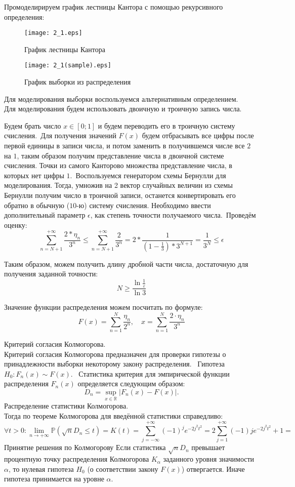 \documentclass[11pt]{article}
\begin{document}
Промоделирируем график лестницы Кантора с помощью рекурсивного определения:
\begin{figure}[ht]

    \texttt{[image: 2\_1.eps]} 
    \caption{График лестницы Кантора}
\end{figure}  

\begin{figure}[ht]

    \texttt{[image: 2\_1(sample).eps]} 
    \caption{График выборки из распределения}
\end{figure}  
\FloatBarrier
 
Для моделирования выборки воспользуемся альтернативным определением. \\
Для моделирования будем использовать двоичную и троичную запись числа.

Будем брать число $x \in [0;1]$ и будем переводить его в троичную систему счисления.\
Для получения значений $F(x)$ будем отбрасывать все цифры после первой единицы в записи числа, и потом заменить в получившемся числе все $2$ на $1$, таким образом получим представление числа в двоичной системе счисления. Точки из самого Канторово множества 
представление числа, в которых нет цифры $1$.\
Воспользуемся генератором схемы Бернулли для моделирования. Тогда, умножив на 2 вектор случайных величин из схемы Бернулли получим число в троичной записи, останется конвертировать его обратно в обычную ($10$-ю) систему счисления. Необходимо ввести дополнительный параметр $\epsilon$, как степень точности получаемого числа.\
Проведём оценку:
$$
\sum_{n=N+1}^{+\infty} \frac{2 * \eta_n}{3^n} \leq \sum_{n=N+1}^{+\infty} \frac{2}{3^n}=2 * \frac{1}{(1 - \frac{1}{3}) * 3^{N+1}}=\frac{1}{3^N} \leq \epsilon
$$

Таким образом, можем получить длину дробной части числа, достаточную для получения заданной точности:
$$
N \geq \frac{\ln \frac{1}{\varepsilon}}{\ln 3}
$$

Значение функции распределения можем посчитать по формуле:
$$
F(x)=\sum_{n=1}^N \frac{\eta_n}{2^n}, \quad x=\sum_{n=1}^N \frac{2 \cdot \eta_n}{3^n}
$$

 Критерий согласия Колмогорова.\\
Критерий согласия Колмогорова предназначен для проверки гипотезы о принадлежности выборки некоторому закону распределения. \
Гипотеза $ H_0 : F_n(x) \sim F(x) $. \
Статистика критерия для эмпирической функции распределения $F_n(x)$ определяется следующим образом:
\[
 D_n = \sup\limits_{x \in \mathbb{R}} | F_n(x) - F(x) |.
\]
Распределение статистики Колмогорова. \\
Тогда по теореме Колмогорова для введённой статистики справедливо:
\[
 \forall t > 0: \lim\limits_{n \to + \infty} \mathbb{P}(\sqrt{n}D_n \leqslant t) = K(t) = \sum\limits_{j = - \infty}^{+\infty} (-1)^{j} e^{-2j^2t^2} = 2 \sum\limits_{j = 1}^{+\infty} (-1){j} e^{-2j^2t^2} + 1 =  
\]
Принятие решения по Колмогорову
Если статистика $\sqrt{n} D_n$ превышает процентную точку распределения Колмогорова $K_{\alpha}$ заданного уровня значимости $\alpha$, то нулевая гипотеза $H_0$ (о соответствии закону $F(x)$) отвергается. Иначе гипотеза принимается на уровне $\alpha$.
\end{document}
